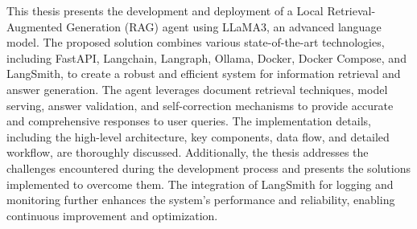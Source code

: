 This thesis presents the development and deployment of a Local Retrieval-Augmented Generation (RAG) agent using LLaMA3, an advanced language model. The proposed solution combines various state-of-the-art technologies, including FastAPI, Langchain, Langraph, Ollama, Docker, Docker Compose, and LangSmith, to create a robust and efficient system for information retrieval and answer generation. The agent leverages document retrieval techniques, model serving, answer validation, and self-correction mechanisms to provide accurate and comprehensive responses to user queries. The implementation details, including the high-level architecture, key components, data flow, and detailed workflow, are thoroughly discussed. Additionally, the thesis addresses the challenges encountered during the development process and presents the solutions implemented to overcome them. The integration of LangSmith for logging and monitoring further enhances the system's performance and reliability, enabling continuous improvement and optimization.
